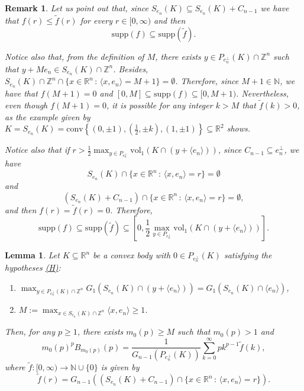 \documentclass[10pt]{amsart}
\newtheorem{lemma}[thm]{Lemma}
\newtheorem{rmk}[thm]{Remark}
\def\R{\mathbb{R}}
\def\N{\mathbb{N}}
\def\Z{\mathbb{Z}}
\def\vol{\mathrm{vol}}
\numberwithin{equation}{section}
\begin{document}
\begin{rmk}\label{rmk:Supports}
Let us point out that, since $S_{e_n}(K)\subseteq S_{e_n}(K)+C_{n-1}$ we have that $f(r)\leq\tilde{f}(r)$ for every $r\in[0,\infty)$ and then
$$
\textrm{supp}(f)\subseteq\textrm{supp}(\tilde{f}).
$$

Notice also that, from the definition of $M$, there exists $y\in P_{e_n^\perp}(K)\cap\Z^n$ such that $y+Me_n\in S_{e_n}(K)\cap\Z^n$. Besides, $S_{e_n}(K)\cap\Z^n\cap\{x\in\R^n\,:\,\langle x,e_n\rangle=M+1\}=\emptyset$. Therefore, since $M+1\in\N$, we have that $f(M+1)=0$ and $[0,M]\subseteq\textrm{supp}(f)\subseteq[0, M+1)$. Nevertheless, even though $f(M+1)=0$, it is possible for any integer $k>M$ that $\tilde{f}(k)>0$, as the example given by $K=S_{e_n}(K)=\textrm{conv}\left\{\left(0,\pm1\right),\left(\frac{1}{2},\pm k\right), (1,\pm 1)\right\}\subseteq\R^2$ shows.

Notice also that if $r>\frac{1}{2}\max_{y\in P_{e_n^\perp}}\vol_1(K\cap(y+\langle e_n\rangle))$, since $C_{n-1}\subseteq e_n^\perp$, we have
$$
S_{e_n}(K)\cap\{x\in\R^n\,:\,\langle x,e_n\rangle=r\}=\emptyset
$$
and
$$
(S_{e_n}(K)+C_{n-1})\cap\{x\in\R^n\,:\,\langle x,e_n\rangle=r\}=\emptyset,
$$
and then $f(r)=\tilde{f}(r)=0$. Therefore,
$$
\textrm{supp}(f)\subseteq\textrm{supp}(\tilde{f})\subseteq\left[0,\frac{1}{2}\max_{y\in P_{e_n^\perp}}\vol_1(K\cap(y+\langle e_n\rangle))\right].
$$

\end{rmk}

\begin{lemma}\label{lem:Existencem0}
Let $K\subseteq\R^n$ be a convex body with $0\in P_{e_n^\perp}(K)$ satisfying the hypotheses \hyperlink{(H)}{\textrm{(H)}}:
\begin{enumerate}
\item[a)] $\displaystyle{\max_{y\in P_{e_n^\perp}(K)\cap\Z^n}G_1(S_{e_n}(K)\cap(y+\langle e_n\rangle))=G_1(S_{e_n}(K)\cap\langle e_n\rangle)}$,
\item[b)] $\displaystyle{M:=\max_{x\in S_{e_n}(K)\cap\Z^n}\langle x,e_n\rangle}\geq 1$.
\end{enumerate}
Then, for any $p\geq1$, there exists $m_0(p)\geq M$ such that $m_0(p)>1$ and
$$
m_0(p)^pB_{m_0(p)}(p)=\frac{1}{G_{n-1}(P_{e_n^\perp}(K))}\sum_{k=0}^\infty pk^{p-1}\tilde{f}(k),
$$
where $\tilde{f}:[0,\infty)\to\N\cup\{0\}$ is given by
$$
\tilde{f}(r)=G_{n-1}((S_{e_n}(K)+C_{n-1})\cap\{x\in\R^n\,:\,\langle x,e_n\rangle=r\}).
$$
\end{lemma}
\end{document}

